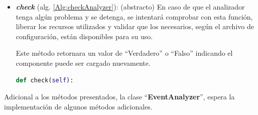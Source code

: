 \begin{itemize}
            \item \textbf{\textit{check}} (alg. \ref{Alg:checkAnalyzer}): 
            (abstracto) En caso de que el analizador tenga algún problema y se detenga, se intentará comprobar con esta función, liberar los recursos utilizados y validar que los necesarios, según el archivo de configuración, están disponibles para su uso.
            
            Este método retornara un valor de ``Verdadero'' o ``Falso'' indicando el componente puede ser cargado nuevamente.
            
            \begin{lstlisting}[language=Python, caption={Firma del método ``\textit{check}'' de la clase ActivityRecognizer.}, label=Alg:checkAnalyzer, numbers=none]
def check(self):
            \end{lstlisting}
            
        \end{itemize}
        
        Adicional a los métodos presentados, la clase ``\textbf{EventAnalyzer}'', espera la implementación de algunos métodos adicionales.
        
